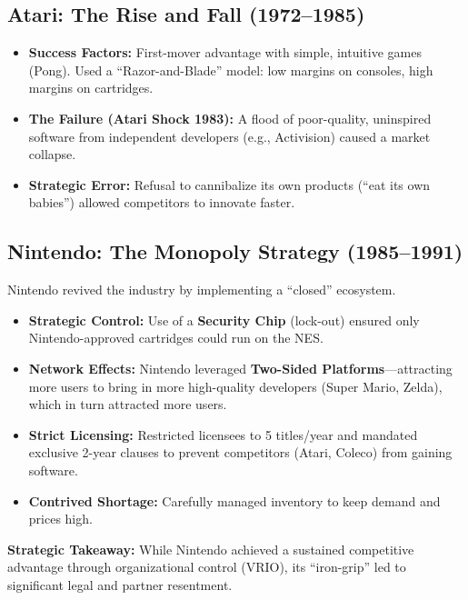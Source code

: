 \subsection{Atari: The Rise and Fall (1972--1985)}
\begin{itemize}
    \item \textbf{Success Factors:} First-mover advantage with simple, intuitive games (Pong).
          Used a ``Razor-and-Blade'' model: low margins on consoles, high margins on
          cartridges.
    \item \textbf{The Failure (Atari Shock 1983):} A flood of poor-quality, uninspired software
          from independent developers (e.g., Activision) caused a market collapse.
    \item \textbf{Strategic Error:} Refusal to cannibalize its own products (``eat its own
          babies'') allowed competitors to innovate faster.
\end{itemize}

\subsection{Nintendo: The Monopoly Strategy (1985--1991)}
Nintendo revived the industry by implementing a ``closed'' ecosystem.
\begin{itemize}
    \item \textbf{Strategic Control:} Use of a \textbf{Security Chip} (lock-out) ensured only Nintendo-approved cartridges could run
          on the NES.
    \item \textbf{Network Effects:} Nintendo leveraged \textbf{Two-Sided Platforms}—attracting more users to bring in more high-quality
          developers (Super Mario, Zelda), which in turn attracted more users.
    \item \textbf{Strict Licensing:} Restricted licensees to 5 titles/year and mandated exclusive
          2-year clauses to prevent competitors (Atari, Coleco) from gaining software.
    \item \textbf{Contrived Shortage:} Carefully managed inventory to keep demand and prices
          high.
\end{itemize}

\textbf{Strategic Takeaway:} While Nintendo achieved a sustained competitive advantage
through organizational control (VRIO), its ``iron-grip'' led to significant
legal and partner resentment.
